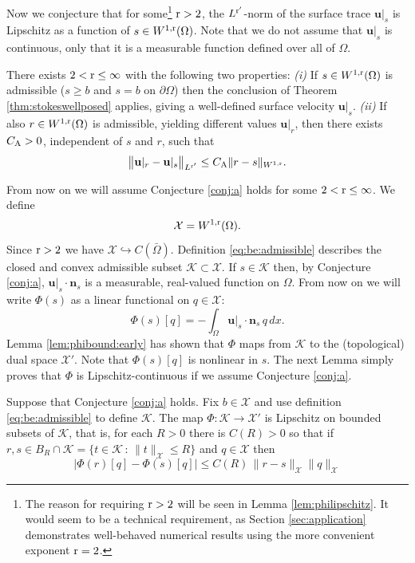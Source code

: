 \documentclass[hidelinks,onefignum,onetabnum,final]{siamart220329}  %
\newcommand{\bn}{\mathbf{n}}
\newcommand{\bu}{\mathbf{u}}
\newcommand{\cK}{\mathcal{K}}
\newcommand{\cX}{\mathcal{X}}
\newcommand{\rr}{{\text{\textnormal{r}}}}
\newcommand{\CA}{C_\text{\textnormal{A}}}
\begin{document}
Now we conjecture that for some\footnote{The reason for requiring $\rr>2$ will be seen in Lemma \ref{lem:philipschitz}.  It would seem to be a technical requirement, as Section \ref{sec:application} demonstrates well-behaved numerical results using the more convenient exponent $\rr=2$.} $\rr>2$, the $L^{\rr'}$-norm of the surface trace $\bu|_s$ is Lipschitz as a function of $s \in W^{1,\rr}(\Omega)$.  Note that we do not assume that $\bu|_s$ is continuous, only that it is a measurable function defined over all of $\Omega$.

\begin{conjecture} \label{conj:a}  There exists $2 < \rr \le \infty$ with the following two properties:  \emph{(i)} If $s\in W^{1,\rr}(\Omega)$ is admissible ($s\ge b$ and $s=b$ on $\partial\Omega$) then the conclusion of Theorem \ref{thm:stokeswellposed} applies, giving a well-defined surface velocity $\bu|_s$.  \emph{(ii)} If also $r\in W^{1,\rr}(\Omega)$ is admissible, yielding different values $\bu|_r$, then there exists $\CA>0$, independent of $s$ and $r$, such that
\begin{equation}
\big\|\bu|_r - \bu|_s\big\|_{L^{\rr'}} \le \CA \|r-s\|_{W^{1,\rr}}. \label{eq:ulipschitz}
\end{equation}
\end{conjecture}

From now on we will assume Conjecture \ref{conj:a} holds for some $2 < \rr \le \infty$.  We define
\begin{equation}
\cX = W^{1,\rr}(\Omega). \label{eq:defineX}
\end{equation}
Since $\rr>2$ we have $\cX \hookrightarrow C(\bar\Omega)$.  Definition \eqref{eq:be:admissible} describes the closed and convex admissible subset $\cK \subset \cX$.  If $s\in\cK$ then, by Conjecture \ref{conj:a}, $\bu|_s\cdot\bn_s$ is a measurable, real-valued function on $\Omega$.  From now on we will write $\Phi(s)$ as a linear functional on $q \in \cX$:
\begin{equation}
\Phi(s)[q] = -\int_\Omega \bu|_s\cdot\bn_s\,q\,dx. \label{eq:definePhi}
\end{equation}
Lemma \ref{lem:phibound:early} has shown that $\Phi$ maps from $\cK$ to the (topological) dual space $\cX'$.  Note that $\Phi(s)[q]$ is nonlinear in $s$.  The next Lemma simply proves that $\Phi$ is Lipschitz-continuous if we assume Conjecture \ref{conj:a}.

\begin{lemma} \label{lem:philipschitz}  Suppose that Conjecture \ref{conj:a} holds.  Fix $b \in \cX$ and use definition \eqref{eq:be:admissible} to define $\cK$.  The map $\Phi:\cK\to\cX'$ is Lipschitz on bounded subsets of $\cK$, that is, for each $R>0$ there is $C(R)>0$ so that if $r,s\in B_R \cap \cK = \{t\in \cK\,:\,\|t\|_{\cX} \le R\}$ and $q\in\cX$ then
\begin{equation}
\Big|\Phi(r)[q] - \Phi(s)[q]\Big| \le C(R)\, \|r-s\|_{\cX} \|q\|_{\cX}  \label{eq:philipschitz}
\end{equation}
\end{lemma}
\end{document}
